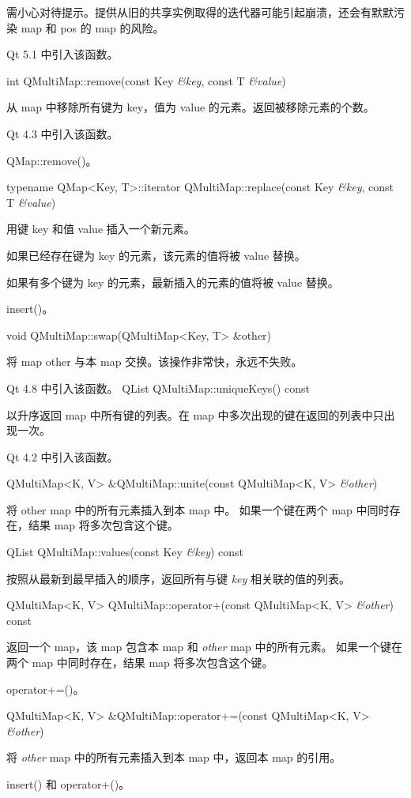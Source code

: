 \begin{notice}
需小心对待提示。提供从旧的共享实例取得的迭代器可能引起崩溃，还会有默默污染 map 和 pos 的 map 的风险。
\end{notice}

Qt 5.1 中引入该函数。

int QMultiMap::remove(const Key \emph{\&key}, const T \emph{\&value})

从 map 中移除所有键为 key，值为 value 的元素。返回被移除元素的个数。

Qt 4.3 中引入该函数。

\begin{seeAlso}
QMap::remove()。
\end{seeAlso}

typename QMap<Key, T>::iterator QMultiMap::replace(const Key \emph{\&key}, const T \emph{\&value})

用键 key 和值 value 插入一个新元素。

如果已经存在键为 key 的元素，该元素的值将被 value 替换。

如果有多个键为 key 的元素，最新插入的元素的值将被 value 替换。

\begin{seeAlso}
insert()。
\end{seeAlso}

void QMultiMap::swap(QMultiMap<Key, T> \&other)

将 map other 与本 map 交换。该操作非常快，永远不失败。

Qt 4.8 中引入该函数。
QList QMultiMap::uniqueKeys() const

以升序返回 map 中所有键的列表。在 map 中多次出现的键在返回的列表中只出现一次。

Qt 4.2 中引入该函数。

QMultiMap<K, V> \&QMultiMap::unite(const QMultiMap<K, V> \emph{\&other})

将 other map 中的所有元素插入到本 map 中。
如果一个键在两个 map 中同时存在，结果 map 将多次包含这个键。

\vspace{2em}

QList QMultiMap::values(const Key \emph{\&key}) const

按照从最新到最早插入的顺序，返回所有与键 \emph{key} 相关联的值的列表。

\vspace{2em}

QMultiMap<K, V> QMultiMap::operator+(const QMultiMap<K, V> \emph{\&other}) const

返回一个 map，该 map 包含本 map 和 \emph{other} map 中的所有元素。
如果一个键在两个 map 中同时存在，结果 map 将多次包含这个键。

\begin{seeAlso}
operator+=()。
\end{seeAlso}

\vspace{2em}

QMultiMap<K, V> \&QMultiMap::operator+=(const QMultiMap<K, V> \emph{\&other})

将 \emph{other} map 中的所有元素插入到本 map 中，返回本 map 的引用。

\begin{seeAlso}
insert() 和 operator+()。
\end{seeAlso}